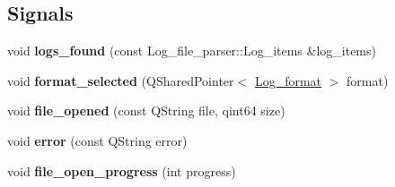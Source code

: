\subsection*{Signals}
\begin{DoxyCompactItemize}
\item 
\hypertarget{class_log__viewer_1_1_log__file__parser_ab2e25ba91cab3a35612817b4afdd1daa}{void {\bfseries logs\-\_\-found} (const Log\-\_\-file\-\_\-parser\-::\-Log\-\_\-items \&log\-\_\-items)}\label{class_log__viewer_1_1_log__file__parser_ab2e25ba91cab3a35612817b4afdd1daa}

\item 
\hypertarget{class_log__viewer_1_1_log__file__parser_aa09259045d1eb36b6161c6df42ffa989}{void {\bfseries format\-\_\-selected} (Q\-Shared\-Pointer$<$ \hyperlink{class_log__viewer_1_1_log__format}{Log\-\_\-format} $>$ format)}\label{class_log__viewer_1_1_log__file__parser_aa09259045d1eb36b6161c6df42ffa989}

\item 
\hypertarget{class_log__viewer_1_1_log__file__parser_af6886ef73843c30cb49f89793109683e}{void {\bfseries file\-\_\-opened} (const Q\-String file, qint64 size)}\label{class_log__viewer_1_1_log__file__parser_af6886ef73843c30cb49f89793109683e}

\item 
\hypertarget{class_log__viewer_1_1_log__file__parser_a01c91220b455b1a5f1d123f4cdc1e904}{void {\bfseries error} (const Q\-String error)}\label{class_log__viewer_1_1_log__file__parser_a01c91220b455b1a5f1d123f4cdc1e904}

\item 
\hypertarget{class_log__viewer_1_1_log__file__parser_ab96a31ad1e9cd88b13fddbf8e27df5e5}{void {\bfseries file\-\_\-open\-\_\-progress} (int progress)}\label{class_log__viewer_1_1_log__file__parser_ab96a31ad1e9cd88b13fddbf8e27df5e5}

\end{DoxyCompactItemize}
